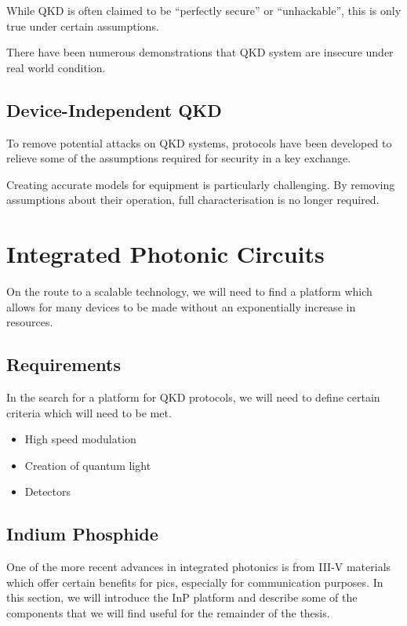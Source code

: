 While \ac{QKD} is often claimed to be ``perfectly secure'' or ``unhackable'', this is only true under certain assumptions. 

There have been numerous demonstrations that \ac{QKD} system are insecure under real world condition.

\subsection*{Device-Independent QKD}

To remove potential attacks on \ac{QKD} systems, protocols have been developed to relieve some of the assumptions required for security in a key exchange. 

Creating accurate models for equipment is particularly challenging. By removing assumptions about their operation, full characterisation is no longer required.

\section{Integrated Photonic Circuits}

On the route to a scalable technology, we will need to find a platform which allows for many devices to be made without an exponentially increase in resources. 

\subsection{Requirements}

In the search for a platform for \ac{QKD} protocols, we will need to define certain criteria which will need to be met.

\begin{itemize}
	\item High speed modulation
	\item Creation of quantum light
	\item Detectors
\end{itemize}



\subsection{Indium Phosphide}

One of the more recent advances in integrated photonics is from III-V materials which offer certain benefits for \acp{pic}, especially for communication purposes. In this section, we will introduce the \acl{InP} platform and describe some of the components that we will find useful for the remainder of the thesis.

